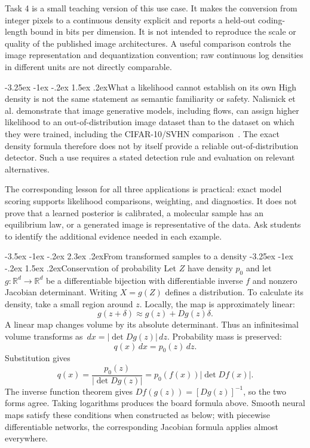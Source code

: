 \documentclass[11pt,a4paper]{article}
\makeatletter
\newcommand{\R}{\mathbb R}
\newcommand{\dd}{\,d}
\renewcommand\section{\@startsection{section}{1}{\z@}%
  {-3.5ex \@plus -1ex \@minus -.2ex}%
  {2.3ex \@plus .2ex}{\normalfont\Large}}
\renewcommand\subsection{\@startsection{subsection}{2}{\z@}%
  {-3.25ex \@plus -1ex \@minus -.2ex}%
  {1.5ex \@plus .2ex}{\normalfont\large}}
\makeatother
\begin{document}
Task 4 is a small teaching version of this use case. It makes the conversion
from integer pixels to a continuous density explicit and reports a held-out
coding-length bound in bits per dimension. It is not intended to reproduce
the scale or quality of the published image architectures. A useful
comparison controls the image representation and dequantization convention;
raw continuous log densities in different units are not directly comparable.

\subsection{What a likelihood cannot establish on its own}
High density is not the same statement as semantic familiarity or safety.
Nalisnick et al. demonstrate that image generative models, including flows,
can assign higher likelihood to an out-of-distribution image dataset than
to the dataset on which they were trained, including the CIFAR-10/SVHN
comparison~\cite{ood}. The exact density formula therefore does not by itself
provide a reliable out-of-distribution detector. Such a use requires a stated
detection rule and evaluation on relevant alternatives.

The corresponding lesson for all three applications is practical: exact
model scoring supports likelihood comparisons, weighting, and diagnostics.
It does not prove that a learned posterior is calibrated, a molecular sample
has an equilibrium law, or a generated image is representative of the data.
Ask students to identify the additional evidence needed in each example.

\section{From transformed samples to a density}
\subsection{Conservation of probability}
Let $Z$ have density $p_0$ and let $g:\R^d\to\R^d$ be a differentiable
bijection with differentiable inverse $f$ and nonzero Jacobian determinant.
Writing $X=g(Z)$ defines a distribution. To calculate its density, take a
small region around $z$. Locally, the map is approximately linear:
\[
 g(z+\delta)\approx g(z)+Dg(z)\delta.
\]
A linear map changes volume by its absolute determinant. Thus an infinitesimal
volume transforms as $\dd x=|\det Dg(z)|\dd z$. Probability mass is preserved:
\[
 q(x)\dd x=p_0(z)\dd z.
\]
Substitution gives
\[
 q(x)=\frac{p_0(z)}{|\det Dg(z)|}
     =p_0(f(x))|\det Df(x)|.
\]
The inverse function theorem gives
$Df(g(z))=[Dg(z)]^{-1}$, so the two forms agree. Taking logarithms produces
the board formula above. Smooth neural maps satisfy these conditions when
constructed as below; with piecewise differentiable networks, the corresponding
Jacobian formula applies almost everywhere.
\end{document}
